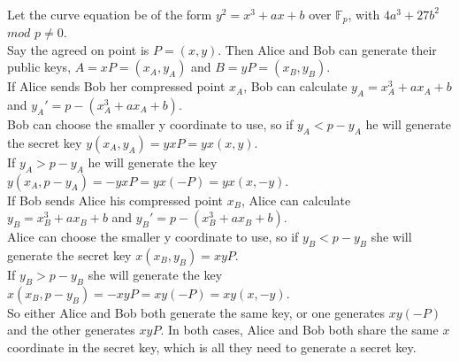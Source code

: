 \documentclass{assignment}
\begin{document}
\begin{problemlist}
\pbitem
\begin{problem}
\end{problem}
\begin{answer}
  \\
  Let the curve equation be of the form $y^2=x^3+ax+b$ over $\mathbb{F}_p$, with $4a^3+27b^2$ $mod$ $p\neq 0$.\\
  Say the agreed on point is $P=(x,y)$. Then Alice and Bob can generate their public keys, $A=xP=(x_A,y_A)$ and $B=yP=(x_B,y_B)$.\\
  If Alice sends Bob her compressed point $x_A$, Bob can calculate $y_A=x_A^3+ax_A+b$ and $y_A'=p-(x_A^3+ax_A+b)$.\\
  Bob can choose the smaller y coordinate to use, so if $y_A < p-y_A$ he will generate the secret key $y(x_A,y_A)=yxP=yx(x,y)$.\\
  If $y_A > p-y_A$ he will generate the key $y(x_A,p-y_A)=-yxP=yx(-P)=yx(x,-y)$.\\
  If Bob sends Alice his compressed point $x_B$, Alice can calculate $y_B=x_B^3+ax_B+b$ and $y_B'=p-(x_B^3+ax_B+b)$.\\
  Alice can choose the smaller y coordinate to use, so if $y_B < p-y_B$ she will generate the secret key $x(x_B,y_B)=xyP$.\\
  If $y_B > p-y_B$ she will generate the key $x(x_B,p-y_B)=-xyP=xy(-P)=xy(x,-y)$.\\
  So either Alice and Bob both generate the same key, or one generates $xy(-P)$ and the other generates $xyP$. In both cases, Alice and Bob both share the same $x$ coordinate in the secret key, which is all they need to generate a secret key.
\end{answer}

\end{problemlist}
\end{document}
